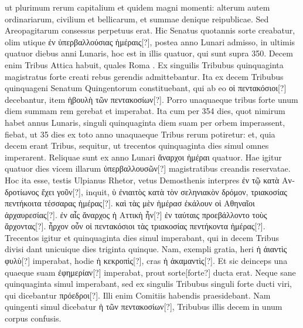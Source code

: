 ut plurimum rerum capitalium et quidem magni momenti: alterum autem
ordinariarum, civilium et bellicarum, et summae denique reipublicae.
Sed Areopagitarum consessus perpetuus erat.
Hic Senatus
quotannis sorte creabatur, olim utique \textgreek{ἐν ὑπερβαλλούσιας ἡμέραις[?]},
postea anno Lunari admisso, in ultimis quatuor diebus anni
Lunaris, hoc est in illis quatuor, qui sunt supra 350.
Decem
enim Tribus Attica habuit, quales Roma .
Ex singuilis Tribubus
quinquaginta magistratus forte creati rebus gerendis admittebantur.
Ita ex decem Tribubus quinquageni Senatum Quingentorum
constituebant, qui ab eo \textgreek{οἱ πεντακόσιοι[?]} decebantur,
 item \textgreek{ἡβουλὴ
τῶν πεντακοσίων[?]}.
Porro unaquaeque tribus forte unum diem summam
rem gerebat et imperabat.
Ita cum per 354 dies, quot nimirum
habet annus Lunaris, singuli quinquaginta diem suam per
orbem imperassent, fiebat, ut 35 dies ex toto anno unaquaeque Tribus
rerum potiretur: et, quia decem erant Tribus, sequitur, ut trecentos
quinquaginta dies simul omnes imperarent.
Reliquae sunt ex anno
Lunari \textgreek{ἄναρχοι ἡμέραι} quatuor.
Hae igitur quatuor dies vicem illarum
\textgreek{ὑπερβαλλουσῶν[?]} magistratibus creandis reservatae.
Hoc ita esse, testis Ulpianus
Rhetor, vetus Demosthenis interpres
 \textgreek{ἐν τῷ κατὰ Ανδροτίωνος ἔχει
γοῦν[?]}, inquit, \textgreek{ὑ ἐνιαιτὸς κατὰ τὸν σεληνιακὸν δρόμον,
 τριακοσίας πεντήκοιτα τέσσαρας
ἡμέρας[?]}.
\textgreek{καὶ τὰς μὲν  ἡμέρασ ἐκάλουν οἱ Αθηναῖοι
 ἀρχαυρεσίας[?]}.
\textgreek{ἐν
αἷς ἄναρχος ἡ Αττικὴ ἦν[?]}
\textgreek{ἐν ταύταις προεβάλλοντο τοὺς ἄρχοντας[?]}.
\textgreek{ἦρχον οὖν
οἱ πεντακόσιοι τὰς τριακοσίας πεντήκοντα ἡμέρας[?]}.
Trecentos igitur et
quinquaginta dies simul imperabant, qui in decem Tribus divisi dant
unicuique dies triginta quinque.
Nam, exempli gratia, heri \textgreek{ἡ ἀιαντὶς φυλὺ[?]}
imperabat, hodie \textgreek{ἡ κεκροπὶς[?]}, cras \textgreek{ἡ ἀκαμαντὶς[?]}.
Et sic deinceps una quaeque
suam \textgreek{ἐφημερίαν[?]} imperabat, prout sorte[forte?] ducta erat.
Neque sane quinquaginta
simul imperabant, sed ex singulis Tribubus singuli forte
ducti viri, qui dicebantur \textgreek{πρόεδροι[?]}.
Illi enim Comitiis habendis praesidebant.
Nam quingenti simul dicebatur \textgreek{ἡ τῶν πεντακοσίων[?]}, Tribubus
illis decem in unum corpus confusis.
